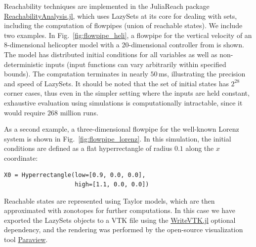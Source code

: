 Reachability techniques are implemented in the JuliaReach package \href{https://github.com/JuliaReach/ReachabilityAnalysis.jl}{ReachabilityAnalysis.jl}, which uses LazySets at its core for dealing with sets, including the computation of flowpipes (union of reachable states).
%
We include two examples. In Fig.~\ref{fig:flowpipe_heli}, a flowpipe for the vertical velocity of an 8-dimensional helicopter model with a 20-dimensional controller from \cite{skogestad2007multivariable} is shown.
%
The model has distributed initial conditions for all variables as well as non-deterministic inputs (input functions can vary arbitrarily within specified bounds).
%
The computation terminates in nearly $50$\,ms, illustrating the precision and speed of LazySets.
%
It should be noted that the set of initial states has $2^{28}$ corner cases, thus even in the simpler setting where the inputs are held constant, exhaustive evaluation using simulations is computationally intractable, since it would require $268$ million runs.

\smallskip
 
As a second example, a three-dimensional flowpipe for the well-known Lorenz system is shown in Fig.~\ref{fig:flowpipe_lorenz}.
%
In this simulation, the initial conditions are defined as a flat hyperrectangle of radius $0.1$ along the $x$ coordinate:

\begin{minipage}{\linewidth}
	\begin{lstlisting}
X0 = Hyperrectangle(low=[0.9, 0.0, 0.0],
				    high=[1.1, 0.0, 0.0])
	\end{lstlisting}
\end{minipage}
%
Reachable states are represented using Taylor models, which are then approximated with zonotopes for further computations.
%
In this case we have exported the LazySets objects to a VTK file using the \href{https://github.com/jipolanco/WriteVTK.jl}{WriteVTK.jl} optional dependency, and the rendering was performed by the open-source visualization tool \href{https://www.paraview.org/}{Paraview}.


